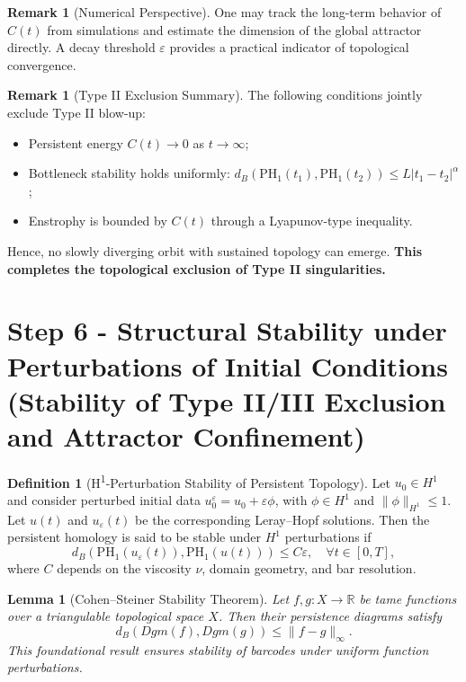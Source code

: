 \documentclass[11pt]{article}
\newtheorem{lemma}[theorem]{Lemma}
\theoremstyle{definition}
\newtheorem{definition}[theorem]{Definition}
\newtheorem{remark}[theorem]{Remark}
\begin{document}
\begin{remark}[Numerical Perspective]
One may track the long-term behavior of $C(t)$ from simulations and estimate the dimension of the global attractor directly. A decay threshold $\varepsilon$ provides a practical indicator of topological convergence.
\end{remark}

\begin{remark}[Type II Exclusion Summary]
The following conditions jointly exclude Type II blow-up:
\begin{itemize}
    \item Persistent energy $C(t) \to 0$ as $t \to \infty$;
    \item Bottleneck stability holds uniformly: $d_B(\mathrm{PH}_1(t_1), \mathrm{PH}_1(t_2)) \le L|t_1 - t_2|^{\alpha}$;
    \item Enstrophy is bounded by $C(t)$ through a Lyapunov-type inequality.
\end{itemize}
Hence, no slowly diverging orbit with sustained topology can emerge. \textbf{This completes the topological exclusion of Type II singularities.}
\end{remark}


\section{Step 6 - Structural Stability under Perturbations of Initial Conditions\\
\small (Stability of Type II/III Exclusion and Attractor Confinement)}
\label{sec:step6}

\begin{definition}[H\textsuperscript{1}-Perturbation Stability of Persistent Topology]
Let $u_0 \in H^1$ and consider perturbed initial data $u_0^\varepsilon = u_0 + \varepsilon \phi$, with $\phi \in H^1$ and $\|\phi\|_{H^1} \le 1$. Let $u(t)$ and $u_\varepsilon(t)$ be the corresponding Leray–Hopf solutions. Then the persistent homology is said to be stable under $H^1$ perturbations if
\[
d_B(\mathrm{PH}_1(u_\varepsilon(t)), \mathrm{PH}_1(u(t))) \le C \varepsilon, \quad \forall t \in [0, T],
\]
where $C$ depends on the viscosity $\nu$, domain geometry, and bar resolution.
\end{definition}

\begin{lemma}[Cohen–Steiner Stability Theorem]
Let $f, g : X \to \mathbb{R}$ be tame functions over a triangulable topological space $X$. Then their persistence diagrams satisfy
\[
d_B(Dgm(f), Dgm(g)) \le \|f - g\|_\infty.
\]
This foundational result ensures stability of barcodes under uniform function perturbations.
\end{lemma}
\end{document}
